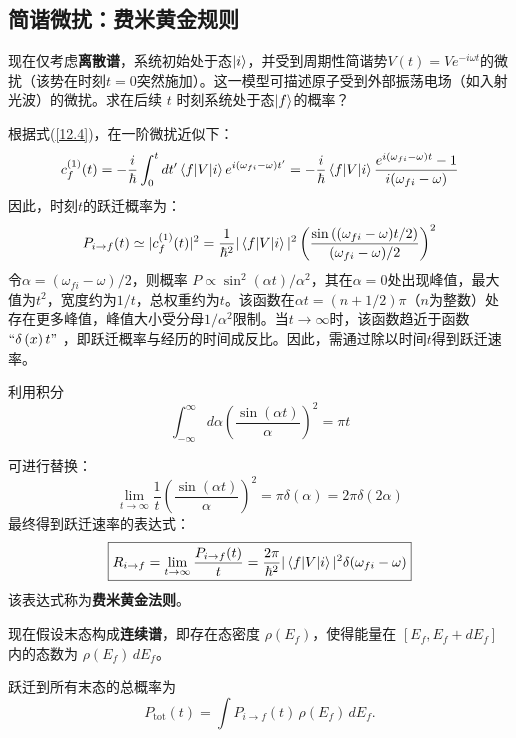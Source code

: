 \subsection{简谐微扰：费米黄金规则}
现在仅考虑\textbf{离散谱}，系统初始处于态$\ket{i}$，并受到周期性简谐势$V(t)=Ve^{-i\omega t}$的微扰（该势在时刻$t=0$突然施加）。这一模型可描述原子受到外部振荡电场（如入射光波）的微扰。求在后续 $t$ 时刻系统处于态$\ket{f}$的概率？

根据式(\ref{12.4})，在一阶微扰近似下：
\begin{equation}
	c_f^{(1)}(t)=-\frac{i}{\hbar}\int_0^t dt'\matrixel{f}{V}{i}e^{i(\omega_{fi}-\omega)t'}=-\frac{i}{\hbar}\matrixel{f}{V}{i}\frac{e^{i(\omega_{fi}-\omega)t}-1}{i(\omega_{fi}-\omega)}
\end{equation}
因此，时刻$t$的跃迁概率为：
\begin{equation}
	P_{i\to f}(t)\simeq|c_f^{(1)}(t)|^2=\frac{1}{\hbar^2}|\matrixel{f}{V}{i}|^2\left(\frac{\sin\left((\omega_{fi}-\omega)t/2\right)}{(\omega_{fi}-\omega)/2}\right)^2
\end{equation}
令$\alpha=(\omega_{fi}-\omega)/2$，则概率 $P \propto {\sin ^2}(\alpha t)/{\alpha ^2}$，其在$\alpha=0$处出现峰值，最大值为$t^2$，宽度约为$1/t$，总权重约为$t$。该函数在$\alpha t=(n+1/2)\pi$（$n$为整数）处存在更多峰值，峰值大小受分母$1/\alpha^2$限制。当$t\to\infty$时，该函数趋近于函数 $``\delta \left( x \right)t"$ ，即跃迁概率与经历的时间成反比。因此，需通过除以时间$t$得到跃迁速率。

利用积分\[\int_{-\infty}^\infty d\alpha\left(\frac{\sin(\alpha t)}{\alpha}\right)^2=\pi t\]

可进行替换：
\begin{equation*}
	\lim_{t\to\infty}\frac{1}{t}\left(\frac{\sin(\alpha t)}{\alpha}\right)^2=\pi\delta(\alpha)=2\pi\delta(2\alpha)
\end{equation*}
最终得到跃迁速率的表达式：
\begin{equation}\label{12.5}
	\boxed{
		R_{i\to f}=\lim_{t\to\infty}\frac{P_{i\to f}(t)}{t}=\frac{2\pi}{\hbar^2}|\matrixel{f}{V}{i}|^2\delta(\omega_{fi}-\omega)
	}
\end{equation}
该表达式称为\textbf{费米黄金法则}。

现在假设末态构成\textbf{连续谱}，即存在态密度 $\rho(E_f)$，使得能量在 $[E_f, E_f + dE_f]$ 内的态数为 $\rho(E_f)\, dE_f$。

跃迁到所有末态的总概率为
\begin{equation}
	P_{\text{tot}}(t) = \int P_{i \to f}(t)\, \rho(E_f)\, dE_f.
\end{equation}


